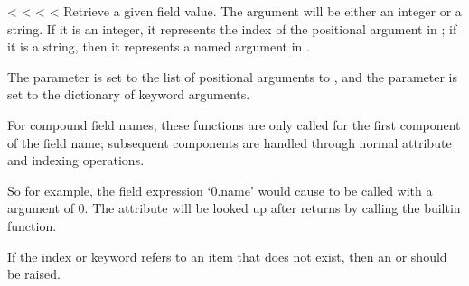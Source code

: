 \documentclass[letterpaper,10pt,english]{sphinxmanual}
\begin{document}
\begin{fulllineitems}
\vspace{5px}

\begin{fulllineitems}
\label{\detokenize{string:string.Formatter.get_value}}
<%
\pysigstartsignatures
<%
<%
<%
Retrieve a given field value.  The  argument will be either an
integer or a string.  If it is an integer, it represents the index of the
positional argument in ; if it is a string, then it represents a
named argument in .

The  parameter is set to the list of positional arguments to
{\hyperref[\detokenize{string:string.Formatter.vformat}]{}}, and the  parameter is set to the dictionary of
keyword arguments.

For compound field names, these functions are only called for the first
component of the field name; subsequent components are handled through
normal attribute and indexing operations.

So for example, the field expression ‘0.name’ would cause
{\hyperref[\detokenize{string:string.Formatter.get_value}]{}} to be called with a  argument of 0.  The 
attribute will be looked up after {\hyperref[\detokenize{string:string.Formatter.get_value}]{}} returns by calling the
built\sphinxhyphen{}in  function.

If the index or keyword refers to an item that does not exist, then an
 or  should be raised.

\end{fulllineitems}


\vspace{5px}


\end{fulllineitems}
\end{document}
